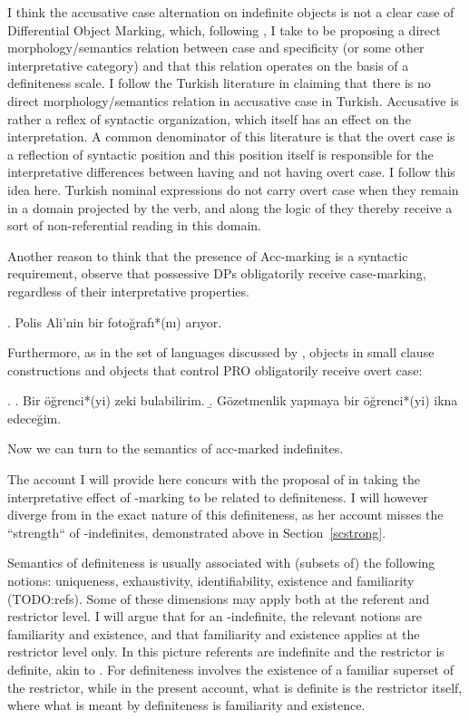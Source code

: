 \documentclass[11pt,a4paper]{article}
\begin{document}
I think the accusative case alternation on indefinite objects is not a clear case of Differential Object Marking, which, following \cite{lopez12}, I take to be proposing a direct morphology/semantics relation between case and specificity (or some other interpretative category) and that this relation operates on the basis of a definiteness scale. I follow the Turkish literature in claiming that there is no direct morphology/semantics relation in accusative case in Turkish. Accusative is rather a reflex of syntactic organization, which itself has an effect on the interpretation. A common denominator of this literature is that the overt case is a reflection of syntactic position and this position itself is responsible for the interpretative differences between having and not having overt case. I follow this idea here. Turkish nominal expressions do not carry overt case when they remain in a domain projected by the verb, and along the logic of  they thereby receive a sort of non-referential reading in this domain.


Another reason to think that the presence of Acc-marking is a syntactic requirement, observe that possessive DPs obligatorily receive case-marking, regardless of their interpretative properties.

\ex. Polis Ali'nin bir fotoğrafı*(nı) arıyor.


Furthermore, as in the set of languages discussed by \cite{lopez12}, objects in small clause constructions and objects that control PRO obligatorily receive overt case:

\ex.
\a. Bir öğrenci*(yi) zeki bulabilirim.
\b. Gözetmenlik yapmaya bir öğrenci*(yi) ikna edeceğim. 


Now we can turn to the semantics of acc-marked indefinites.

The account I will provide here concurs with the proposal of  in taking the interpretative effect of \acc-marking to be related to definiteness. I will however diverge from  in the exact nature of this definiteness, as her account misses the ``strength`` of \acc-indefinites, demonstrated above in Section~\ref{scstrong}.

Semantics of definiteness is usually associated with (subsets of) the following notions: uniqueness, exhaustivity, identifiability, existence and familiarity (TODO:refs). Some of these dimensions may apply both at the referent and restrictor level. I will argue that for an \acc-indefinite, the relevant notions are familiarity and existence, and that familiarity and existence applies at the restrictor level only. In this picture referents are indefinite and the restrictor is definite, akin to . For  definiteness involves the existence of a familiar superset of the restrictor, while in the present account, what is definite is the restrictor itself, where what is meant by definiteness is familiarity and existence. 
\end{document}

